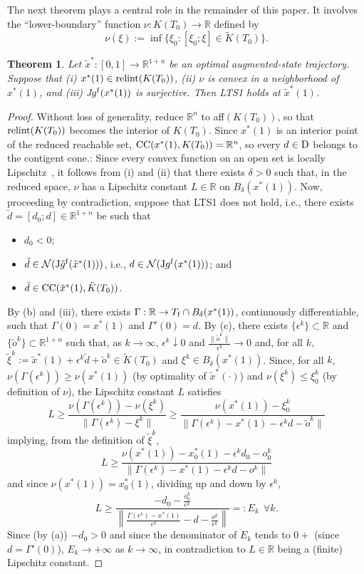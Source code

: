 \documentclass[letterpaper,10pt,conference]{ieeeconf}
\def\R{{\mathbb{R}}}
\newtheorem{theorem}{Theorem} %
\begin{document}
The next theorem plays a central role in the remainder of this paper.
It involves the ``lower-boundary'' function $\nu:K(T_0)\to\R$ defined by 
\[
\nu(\xi):=\inf\{\xi_0:[\xi_0;\xi]\in\tilde K(T_0)\}.
\]


\begin{theorem}
\label{thm:LTS1whenri(K)}
Let $\tilde x^*:[0,1]\to\R^{1+n}$ be an optimal augmented-state trajectory.
Suppose that (i) $x^*(1)\in{\rm relint}(K(T_0))$,
(ii) $\nu$ is convex in a neighborhood of $x^*(1)$, and 
(iii) {\rm J}$g^{\rm f}(x^*(1))$ is surjective.
Then LTS1 holds at $\tilde x^*(1)$.  
\end{theorem}

\begin{proof}
Without loss of generality, reduce $\R^n$ to aff$(K(T_0))$, so that
${\rm relint}(K(T_0))$ becomes the interior of $K(T_0)$.
Since $x^*(1)$ is an interior point of the reduced reachable set,
${\rm CC}(x^*(1),K(T_0))=\R^n$, so every $d\in{\rm D}$ belongs to the
contigent cone.:
Since every convex function on an open set is locally 
Lipschitz~\cite[Corollary 2.27]{MR4633252}, it follows from (i) and (ii) that
there exists $\delta>0$ such that, in the reduced
space,  $\nu$ has a Lipschitz constant $L\in\R$ on $B_\delta(x^*(1))$.
Now, proceeding by contradiction, suppose that LTS1 does not hold, i.e.,
there exists $\tilde d=[d_0;d]\in\R^{1+n}$ be such that
\begin{itemize}
\item[(a)] $d_0<0$;
\item[(b)] $\tilde d\in{\mathcal N}({\rm J}\tilde g^{\rm f}(\tilde x^*(1)))$,
i.e., $d\in{\mathcal N}({\rm J}g^{\rm f}(x^*(1)))$; and
\item[(c)] $\tilde d\in{\rm CC}(\tilde x^*(1),\tilde K(T_0))$.
\end{itemize}
%
By (b) and (iii), there exists $\Gamma:\R\to T_{\rm f}\cap B_\delta(x^*(1))$,
continuously differentiable,
such that $\Gamma(0)=x^*(1)$ and $\Gamma'(0)=d$.  By (c),
there exists $\{\epsilon^k\}\subset\R$ and $\{\tilde o^k\}\subset\R^{1+n}$
such that, as $k\to\infty$,
$\epsilon^k\downarrow0$ and $\frac{\|\tilde o^k\|}{\epsilon^k}\to0$
and, for all $k$, 
$\tilde\xi^k := \tilde x^*(1)+\epsilon^k\tilde d +\tilde o^k\in\tilde K(T_0)$
and $\xi^k\in B_\delta(x^*(1))$.
Since, for all $k$, $\nu(\Gamma(\epsilon^k))\geq\nu(x^*(1))$ 
(by optimality of $\tilde x^*(\cdot)$) and $\nu(\xi^k)\leq\xi_0^k$ 
(by definition of $\nu$), the Lipschitz constant $L$ satisfies
\[
L\geq\frac{\nu(\Gamma(\epsilon^k))-\nu(\xi^k)}{\|\Gamma(\epsilon^k)-\xi^k\|} 
\geq\frac{\nu(x^*(1))-\xi_0^k}{\|\Gamma(\epsilon^k)-x^*(1)-\epsilon^k d 
- \tilde o^k\|}
\]
implying, from the definition of $\tilde\xi^k$,
\[
L\geq\frac{\nu(x^*(1)) - x_0^*(1) - \epsilon^k d_0 - o_0^k}
{\|\Gamma(\epsilon^k)-x^*(1)-\epsilon^k d - o^k\|}
\]
and since $\nu(x^*(1))=x_0^*(1)$, dividing up and down by $\epsilon^k$,
\[
L\geq\frac{-d_0-\frac{o_0^k}{\epsilon^k}}
{\left\|
\frac{\Gamma(\epsilon^k)-x^*(1)}{\epsilon^k}- d - \frac{o^k}{\epsilon^k}
\right\|} =:E_k ~~\forall k.
\]
Since (by (a)) $-d_0>0$ and since the denominator of $E_k$ tends to $0+$
(since $d=\Gamma'(0)$),
$E_k\to+\infty$ as $k\to\infty$, in contradiction to $L\in\R$ being a
(finite) Lipschitz constant.
\end{proof}
\end{document}
